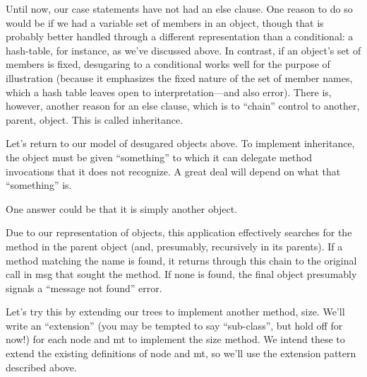 
Until now, our case statements have not had an else clause. One reason to do so
would be if we had a variable set of members in an object, though that is
probably better handled through a different representation than a conditional: a
hash-table, for instance, as we’ve discussed above. In contrast, if an object’s
set of members is fixed, desugaring to a conditional works well for the purpose
of illustration (because it emphasizes the fixed nature of the set of member
names, which a hash table leaves open to interpretation—and also error). There
is, however, another reason for an else clause, which is to “chain” control to
another, parent, object. This is called inheritance.

Let’s return to our model of desugared objects above. To implement inheritance,
the object must be given “something” to which it can delegate method invocations
that it does not recognize. A great deal will depend on what that “something”
is.

One answer could be that it is simply another object.

Due to our representation of objects, this application effectively searches for
the method in the parent object (and, presumably, recursively in its parents).
If a method matching the name is found, it returns through this chain to the
original call in msg that sought the method. If none is found, the final object
presumably signals a “message not found” error.


Let’s try this by extending our trees to implement another method, size. We’ll
write an “extension” (you may be tempted to say “sub-class”, but hold off for
now!) for each node and mt to implement the size method. We intend these to
extend the existing definitions of node and mt, so we’ll use the extension
pattern described above.

\secdown





\secup
